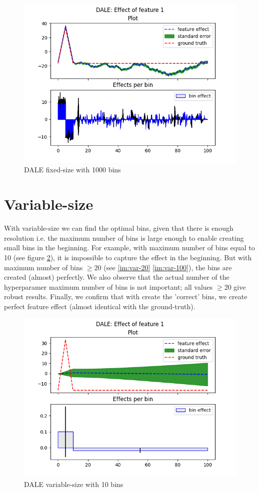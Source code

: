 \documentclass{article}
\begin{document}
\begin{figure}[!h]
\centering
\includegraphics[width=0.9\linewidth]{Figure_dale_fixed_1000.png}
\caption{DALE fixed-size with 1000 bins}
\label{im:fixed-1000}
\end{figure}


\section{Variable-size}

With variable-size we can find the optimal bins, given that there is
enough resolution i.e. the maximum number of bins is large enough to
enable creating small bins in the beginning. For example, with maximum
number of bins equal to 10 (see figure \ref{im:var-10}), it is
impossible to capture the effect in the beginning. But with maximum
number of bins \(\geq 20\) (see \ref{im:var-20} \ref{im:var-100}), the
bins are created (almost) perfectly. We also observe that the actual
number of the hyperparamer maximum number of bins is not important;
all values \(\geq 20\) give robust results. Finally, we confirm that
with create the 'correct' bins, we create perfect feature effect
(almost identical with the ground-truth).

\begin{figure}[!h]
\centering
\includegraphics[width=0.9\linewidth]{Figure_dale_var_10.png}
\caption{DALE variable-size with 10 bins}
\label{im:var-10}
\end{figure}
\end{document}
